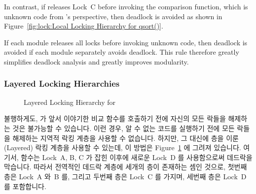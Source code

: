 In contrast, if  releases Lock~C before invoking the
comparison function, which is unknown code from 's perspective,
then deadlock is avoided as shown in
Figure~\ref{fig:lock:Local Locking Hierarchy for qsort()}.

If each module releases all locks before invoking unknown code, then
deadlock is avoided if each module separately avoids deadlock.
This rule therefore greatly simplifies deadlock analysis and greatly
improves modularity.
\fi

\subsubsection{Layered Locking Hierarchies}
\label{sec:locking:Layered Locking Hierarchies}

\begin{figure}[tb]
\centering
{}
\caption{Layered Locking Hierarchy for }
\label{fig:lock:Layered Locking Hierarchy for qsort()}
\end{figure}

불행하게도,  가 앞서 이야기한 비교 함수를 호출하기 전에 자신의 모든
락들을 해제하는 것은 불가능할 수 있습니다.
이런 경우, 알 수 없는 코드를 실행하기 전에 모든 락들을 해제하는 지역적 락킹
계층을 사용할 수 없습니다.
하지만, 그 대신에 층을 이룬 (Layered) 락킹 계층을 사용할 수 있는데, 이 방법은
Figure~\ref{fig:lock:Layered Locking Hierarchy for qsort()} 에 그려져 있습니다.
여기서,  함수는 Lock~A, B, C 가 잡힌 이후에 새로운 Lock~D 를
사용함으로써 데드락을 막습니다.
따라서 전역적인 데드락 계층에 세개의 층이 존재하는 셈인 것으로, 첫번째 층은
Lock~A 와~B 를, 그리고 두번째 층은 Lock~C 를 가지며, 세번째 층은 Lock~D 를
포함합니다.
\iffalse

